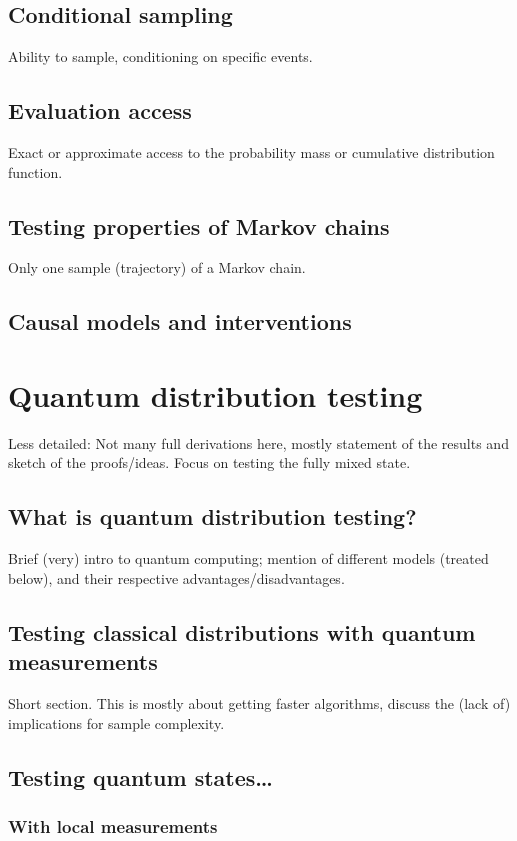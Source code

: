 \documentclass[biber]{nowfnt} %
\begin{document}
\section{Conditional sampling}
Ability to sample, conditioning on specific events.

\section{Evaluation access}
Exact or approximate access to the probability mass or cumulative
distribution function.

\section{Testing properties of Markov chains}
Only one sample (trajectory) of a Markov chain.

\section{Causal models and interventions}


\chapter{Quantum distribution testing}

Less detailed: Not many full derivations here, mostly statement of the results and
sketch of the proofs/ideas. Focus on testing the fully mixed state.
\section{What is quantum distribution testing?}
Brief (very) intro to quantum computing; mention of different models
(treated below), and their respective advantages/disadvantages.
\section{Testing classical distributions with quantum measurements}
Short section. This is mostly about getting faster algorithms, discuss
the (lack of) implications for sample complexity.
\section{Testing quantum states\dots}
\subsection{With local measurements}
\end{document}
